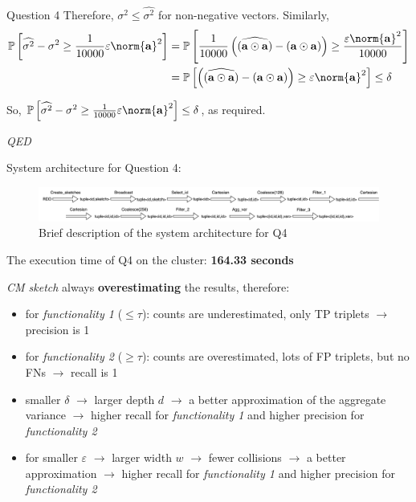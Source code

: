 \begin{block}{Question 4}
Therefore, $\sigma^2\leq\widehat{\sigma^2}$ for non-negative vectors. Similarly,
\begin{equation}
    \begin{aligned}
    \mathbb{P}\left[\widehat{\sigma^2} - \sigma^2 \geq \frac{1}{10000}\varepsilon\norm{\mathbf{a}}^2\right] & = \mathbb{P}\left[\frac{1}{10000}\left(\widehat{(\mathbf{a}\odot\mathbf{a})} - (\mathbf{a}\odot\mathbf{a})\right) \geq \frac{\varepsilon\norm{\mathbf{a}}^2}{10000}\right] \\ 
    & = \mathbb{P}\left[\left(\widehat{(\mathbf{a}\odot\mathbf{a})} - (\mathbf{a}\odot\mathbf{a})\right) \geq \varepsilon\norm{\mathbf{a}}^2\right]\leq\delta
    \end{aligned}
\end{equation}

So, $\mathbb{P}\left[\widehat{\sigma^2} - \sigma^2 \geq \frac{1}{10000}\varepsilon\norm{\mathbf{a}}^2\right]\leq\delta$, as required.
\begin{flushright}
    \emph{QED}
\end{flushright}

System architecture for Question 4:
\begin{figure}
    \centering
    \includegraphics[width=.95\linewidth]{../assets/images/q4_diagram.png}
    \caption{Brief description of the system architecture for Q4}
    \label{fig:q4_diagram}
\end{figure}

The execution time of Q4 on the cluster: \textbf{164.33 seconds} 

\begin{center}
    
\end{center}

\emph{CM sketch} always \textbf{overestimating} the results, therefore:
\begin{itemize}
    \item for \emph{functionality 1} ($\leq\tau$): counts are underestimated, only TP triplets $\rightarrow$ precision is 1
    \item for \emph{functionality 2} ($\geq\tau$): counts are overestimated, lots of FP triplets, but no FNs $\rightarrow$ recall is 1
    \item smaller $\delta$ $\rightarrow$ larger depth $d$ $\rightarrow$ a better approximation of the aggregate variance $\rightarrow$ higher recall for \emph{functionality 1} and higher precision for \emph{functionality 2}
    \item for smaller $\varepsilon$ $\rightarrow$ larger width $w$ $\rightarrow$ fewer collisions $\rightarrow$ a better approximation $\rightarrow$ higher recall for \emph{functionality 1} and higher precision for \emph{functionality 2}
\end{itemize}


\end{block}
